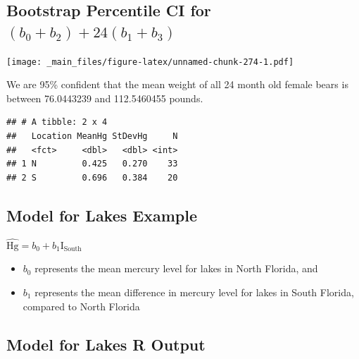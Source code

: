 \documentclass[]{book}
\newenvironment{Shaded}{\begin{snugshade}}{\end{snugshade}}
\newcommand{\KeywordTok}[1]{\textcolor[rgb]{0.13,0.29,0.53}{\textbf{#1}}}
\newcommand{\DataTypeTok}[1]{\textcolor[rgb]{0.13,0.29,0.53}{#1}}
\newcommand{\StringTok}[1]{\textcolor[rgb]{0.31,0.60,0.02}{#1}}
\newcommand{\OperatorTok}[1]{\textcolor[rgb]{0.81,0.36,0.00}{\textbf{#1}}}
\newcommand{\NormalTok}[1]{#1}
\providecommand{\tightlist}{%
  \setlength{\itemsep}{0pt}\setlength{\parskip}{0pt}}
\begin{document}
\subsection{\texorpdfstring{Bootstrap Percentile CI for
\((b_0 + b_2) + 24(b_1+b_3)\)}{Bootstrap Percentile CI for (b\_0 + b\_2) + 24(b\_1+b\_3)}}\label{bootstrap-percentile-ci-for-b_0-b_2-24b_1b_3-1}

\texttt{[image: \_main\_files/figure-latex/unnamed-chunk-274-1.pdf]}

We are 95\% confident that the mean weight of all 24 month old female
bears is between 76.0443239 and 112.5460455 pounds.

\begin{Shaded}
\end{Shaded}

\begin{verbatim}
## # A tibble: 2 x 4
##   Location MeanHg StDevHg     N
##   <fct>     <dbl>   <dbl> <int>
## 1 N         0.425   0.270    33
## 2 S         0.696   0.384    20
\end{verbatim}

\subsection{Model for Lakes Example}\label{model-for-lakes-example}

\(\widehat{\text{Hg}} = b_0 +b_1\text{I}_{\text{South}}\)

\begin{itemize}
\tightlist
\item
  \(b_0\) represents the mean mercury level for lakes in North Florida,
  and\\
\item
  \(b_1\) represents the mean difference in mercury level for lakes in
  South Florida, compared to North Florida
\end{itemize}

\subsection{Model for Lakes R Output}\label{model-for-lakes-r-output-1}
\end{document}

